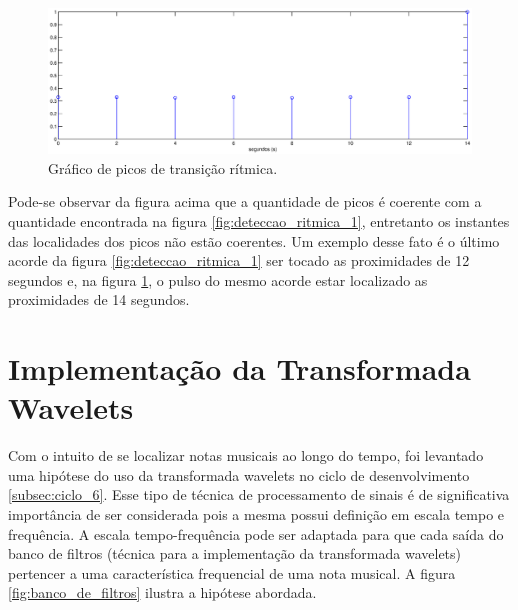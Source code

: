 \begin{figure}[h]
    \centering
    \includegraphics[keepaspectratio=true,scale=0.45]{figuras/deteccao_ritmica_2.eps}
  \caption{Gráfico de picos de transição rítmica.}
  \label{fig:deteccao_ritmica_2}
\end{figure}

Pode-se observar da figura acima que a quantidade de picos é coerente com a quantidade encontrada na figura \ref{fig:deteccao_ritmica_1}, entretanto os instantes das localidades dos picos não estão coerentes. Um exemplo desse fato é o último acorde da figura \ref{fig:deteccao_ritmica_1} ser tocado as proximidades de 12 segundos e, na figura \ref{fig:deteccao_ritmica_2}, o pulso do mesmo acorde estar localizado as proximidades de 14 segundos.

\section{Implementação da Transformada Wavelets}
Com o intuito de se localizar notas musicais ao longo do tempo, foi levantado uma hipótese do uso da transformada wavelets no ciclo de desenvolvimento \ref{subsec:ciclo_6}. Esse tipo de técnica de processamento de sinais é de significativa importância de ser considerada pois a mesma possui definição em escala tempo e frequência. A escala tempo-frequência pode ser adaptada para que cada saída do banco de filtros (técnica para a implementação da transformada wavelets) pertencer a uma característica frequencial de uma nota musical. A figura \ref{fig:banco_de_filtros} ilustra a hipótese abordada.

